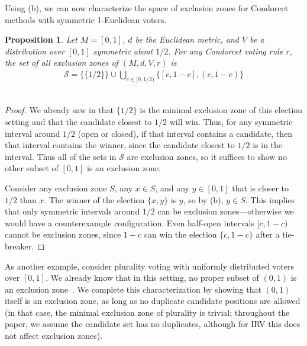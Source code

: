\documentclass{article}
\theoremstyle{theorem}
\newtheorem{proposition}{Proposition}
\theoremstyle{definition}
\begin{document}
Using (b), we can now characterize the space of exclusion zones for Condorcet methods with symmetric 1-Euclidean voters.

\begin{proposition}
  Let $M = [0, 1]$, $d$ be the Euclidean metric, and $V$ be a distribution over $[0, 1]$ symmetric about $1/2$. For any Condorcet voting rule $r$, the set of all exclusion zones of $(M, d, V, r)$ is
  \begin{align*}
    \mathcal S = \{\{1/2\}\} \cup \bigcup_{ c \in [0, 1/2)} \{[c, 1-c], (c, 1-c)\}
  \end{align*}\\
\end{proposition} 
\begin{proof}
  We already saw in  that $\{1/2\}$ is the minimal exclusion zone of this election setting and that the candidate closest to $1/2$ will win. Thus, for any symmetric interval around $1/2$ (open or closed), if that interval contains a candidate, then that interval contains the winner, since the candidate closest to $1/2$ is in the interval. Thus all of the sets in $\mathcal S$ are exclusion zones, so it suffices to show no other subset of $[0, 1]$ is an exclusion zone.
  
  Consider any exclusion zone $S$, any $x\in S$, and any $y \in [0, 1]$ that is closer to $1/2$ than $x$. The winner of the election $\{x, y\}$ is $y$, so by (b), $y \in S$. This implies that only symmetric intervals around $1/2$ can be exclusion zones---otherwise we would have a counterexample configuration. Even half-open intervals $[c, 1-c)$ cannot be exclusion zones, since $1-c$ can win the election $\{c, 1-c\}$ after a tie-breaker.  
\end{proof}

As another example, consider plurality voting with uniformly distributed voters over $[0, 1]$. We already know that in this setting, no proper subset of $(0, 1)$ is an exclusion zone~\cite{tomlinson2024moderating}. We complete this characterization by showing that $(0, 1)$ itself is an exclusion zone, as long as no duplicate candidate positions are allowed (in that case, the minimal exclusion zone of plurality is trivial; throughout the paper, we assume the candidate set has no duplicates, although for IRV this does not affect exclusion zones).
\end{document}
